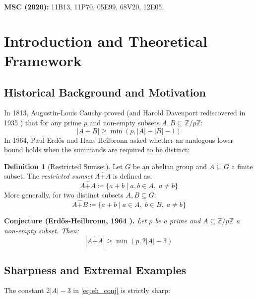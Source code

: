 \documentclass[11pt,a4paper]{article}
\theoremstyle{definition}
\newtheorem{definition}[theorem]{Definition}
\begin{document}
\noindent\textbf{MSC (2020):} 11B13, 11P70, 05E99, 68V20, 12E05.

\tableofcontents
\newpage

\section{Introduction and Theoretical Framework}

\subsection{Historical Background and Motivation}
In 1813, Augustin-Louis Cauchy proved (and Harold Davenport rediscovered in 1935 \cite{davenport1935}) that for any prime $p$ and non-empty subsets $A, B \subseteq \mathbb{Z}/p\mathbb{Z}$:
\begin{equation}\label{eq:cauchy_davenport}
|A + B| \ge \min(p, |A| + |B| - 1)
\end{equation}
In 1964, Paul Erd\H{o}s and Hans Heilbronn \cite{erdos1964heilbronn} asked whether an analogous lower bound holds when the summands are required to be distinct:

\begin{definition}[Restricted Sumset]\label{def:restricted_sumset}
Let $G$ be an abelian group and $A \subseteq G$ a finite subset.
The \emph{restricted sumset} $A \hat{+} A$ is defined as:
\begin{equation}\label{eq:restricted_sumset}
A \hat{+} A \coloneqq \{ a + b \mid a, b \in A, \; a \ne b \}
\end{equation}
More generally, for two distinct subsets $A, B \subseteq G$:
\begin{equation}\label{eq:restricted_ab}
A \hat{+} B \coloneqq \{ a + b \mid a \in A, \; b \in B, \; a \ne b \}
\end{equation}
\end{definition}

\noindent\textbf{Conjecture (Erd\H{o}s-Heilbronn, 1964 \cite{erdos1964heilbronn}).} \textit{Let $p$ be a prime and $A \subseteq \mathbb{Z}/p\mathbb{Z}$ a non-empty subset. Then:}
\begin{equation}\label{eq:eh_conj}
|A \hat{+} A| \ge \min(p, 2|A| - 3)
\end{equation}

\subsection{Sharpness and Extremal Examples}
The constant $2|A| - 3$ in \eqref{eq:eh_conj} is strictly sharp:
\end{document}
